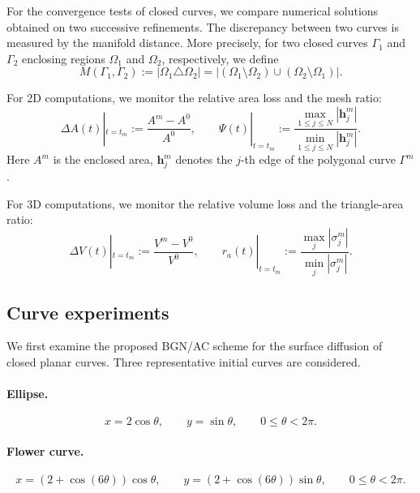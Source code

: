 \documentclass[smallextended]{svjour3}
\numberwithin{equation}{section}
\begin{document}
	
	For the convergence tests of closed curves, we compare numerical solutions obtained on two successive refinements. The discrepancy between two curves is measured by the manifold distance. More precisely, for two closed curves $\Gamma_1$ and $\Gamma_2$ enclosing regions $\Omega_1$ and $\Omega_2$, respectively, we define
	\[
	M(\Gamma_1,\Gamma_2)
	:=
	|\Omega_1\triangle\Omega_2|
	=
	|(\Omega_1\setminus\Omega_2)\cup(\Omega_2\setminus\Omega_1)|.
	\]
	
	For 2D computations, we monitor the relative area loss and the mesh ratio:
	\[
	\Delta A(t)|_{t=t_m}:= \frac{A^m-A^0}{A^0},\qquad
	\Psi(t)|_{t=t_m}:=\frac{\max_{1\le j\le N}|\mathbf{h}_j^m|}
	{\min_{1\le j\le N}|\mathbf{h}_j^m|}.
	\]
	Here $A^m$ is the enclosed area, $\mathbf{h}_j^m$ denotes the $j$-th edge of the polygonal curve $\Gamma^m$.
	
	For 3D computations, we monitor the relative volume loss and the triangle-area ratio:
	\[
	\Delta V(t)|_{t=t_m}:= \frac{V^m-V^0}{V^0},\qquad
	r_a(t)|_{t=t_m}
	:=
	\frac{\max_j |\sigma_j^m|}{\min_j |\sigma_j^m|}.
	\]

	\subsection{Curve experiments}

We first examine the proposed BGN/AC scheme for the surface diffusion of closed planar curves. Three representative initial curves are considered.

\paragraph{Ellipse.}
\[
x=2\cos\theta,\qquad y=\sin\theta,\qquad 0\le\theta<2\pi.
\]

\paragraph{Flower curve.}
\[
x=(2+\cos(6\theta))\cos\theta,\qquad
y=(2+\cos(6\theta))\sin\theta,\qquad 0\le\theta<2\pi.
\]
\end{document}

